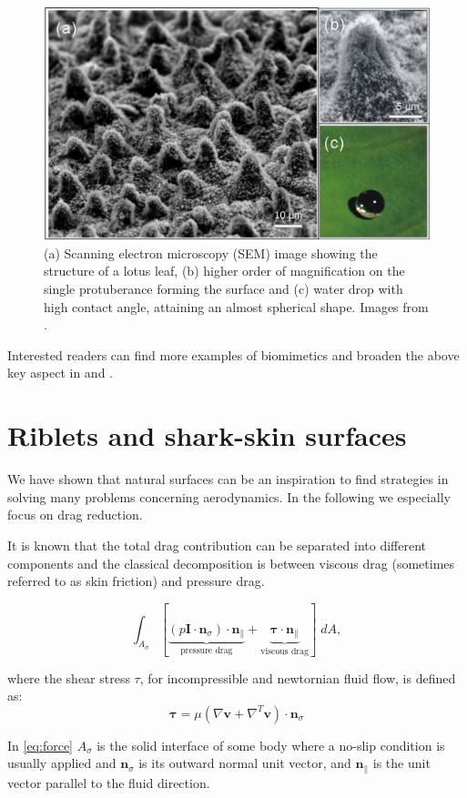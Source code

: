 \begin{figure}[t]
	\centering
	\includegraphics[width=0.6\linewidth]{chapter_1/lotus}
	\caption{(a) Scanning electron microscopy (SEM) image showing the structure of a lotus leaf, (b) higher order of magnification on the single protuberance forming the surface and (c) water drop with high contact angle, attaining an almost spherical shape. Images from \citet{stratakis2009laser}.}
	\label{fig:lotus}
\end{figure}

Interested readers can find more examples of biomimetics and broaden the above key aspect in \citet{bhushan2016biomimetics} and \citet{tropea2012nature}.

\section{Riblets and shark-skin surfaces}
We have shown that natural surfaces can be an inspiration to find strategies in solving many problems concerning aerodynamics. In the following we especially focus on drag reduction.

It is known that the total drag contribution can be separated into different components and the classical decomposition is between viscous drag (sometimes referred to as skin friction) and pressure drag.

\begin{equation}
 \int_{A_{\sigma}}  [ \underbrace{\left({p} \mathbf{I}  \cdot  \mathbf{n}_{\sigma} \right)   \cdot \mathbf{n}_{\parallel} }_\text{pressure drag}  +  \underbrace{\boldsymbol{\tau} \cdot \mathbf{n}_{\parallel}}_\text{viscous drag} ] \; dA ,
 \label{eq:force}
\end{equation}

\noindent where the shear stress $\tau$, for incompressible and newtornian fluid flow, is defined as:
$$
\boldsymbol{\tau} = \mu \left( \nabla \mathbf{v} +  \nabla^T \mathbf{v} \right) \cdot  \mathbf{n}_{\sigma}
$$

\noindent In \eqref{eq:force} $A_{\sigma}$ is the solid interface of some body where a no-slip condition is usually applied and $ \mathbf{n}_{\sigma}$ is its outward normal unit vector, and $\mathbf{n}_{\parallel}$ is the unit vector parallel to the fluid direction.

